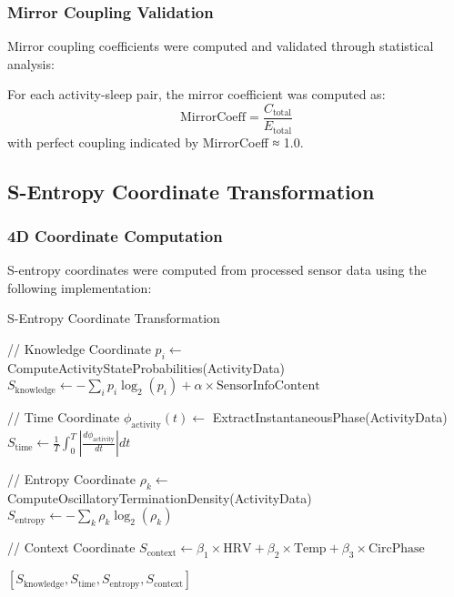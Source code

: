 \subsubsection{Mirror Coupling Validation}

Mirror coupling coefficients were computed and validated through statistical analysis:

\begin{definition}
For each activity-sleep pair, the mirror coefficient was computed as:
\begin{equation}
\text{MirrorCoeff} = \frac{C_{\text{total}}}{E_{\text{total}}}
\end{equation}
with perfect coupling indicated by MirrorCoeff ≈ 1.0.
\end{definition}

\subsection{S-Entropy Coordinate Transformation}

\subsubsection{4D Coordinate Computation}

S-entropy coordinates were computed from processed sensor data using the following implementation:

\begin{algorithm}
\caption{S-Entropy Coordinate Transformation}
\begin{algorithmic}
    \State // Knowledge Coordinate
    \State $p_i \leftarrow$ ComputeActivityStateProbabilities(ActivityData)
    \State $S_{\text{knowledge}} \leftarrow -\sum_i p_i \log_2(p_i) + \alpha \times \text{SensorInfoContent}$
    
    \State // Time Coordinate  
    \State $\phi_{\text{activity}}(t) \leftarrow$ ExtractInstantaneousPhase(ActivityData)
    \State $S_{\text{time}} \leftarrow \frac{1}{T} \int_0^T |\frac{d\phi_{\text{activity}}}{dt}| dt$
    
    \State // Entropy Coordinate
    \State $\rho_k \leftarrow$ ComputeOscillatoryTerminationDensity(ActivityData)
    \State $S_{\text{entropy}} \leftarrow -\sum_k \rho_k \log_2(\rho_k)$
    
    \State // Context Coordinate
    \State $S_{\text{context}} \leftarrow \beta_1 \times \text{HRV} + \beta_2 \times \text{Temp} + \beta_3 \times \text{CircPhase}$
    
    \State \Return $[S_{\text{knowledge}}, S_{\text{time}}, S_{\text{entropy}}, S_{\text{context}}]$
\EndProcedure
\end{algorithmic}
\end{algorithm}

